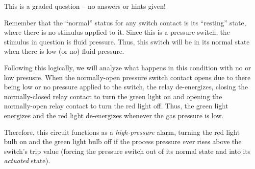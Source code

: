 
This is a graded question -- no answers or hints given!
 






Remember that the ``normal'' status for any switch contact is its ``resting'' state, where there is no stimulus applied to it.  Since this is a pressure switch, the stimulus in question is fluid pressure.  Thus, this switch will be in its normal state when there is low (or no) fluid pressure.

Following this logically, we will analyze what happens in this condition with no or low presusre.  When the normally-open pressure switch contact opens due to there being low or no pressure applied to the switch, the relay de-energizes, closing the normally-closed relay contact to turn the green light on and opening the normally-open relay contact to turn the red light off.  Thus, the green light energizes and the red light de-energizes whenever the gas pressure is low.

\vskip 10pt

Therefore, this circuit functions as a {\it high-pressure} alarm, turning the red light bulb on and the green light bulb off if the process pressure ever rises above the switch's trip value (forcing the pressure switch out of its normal state and into its {\it actuated} state).




